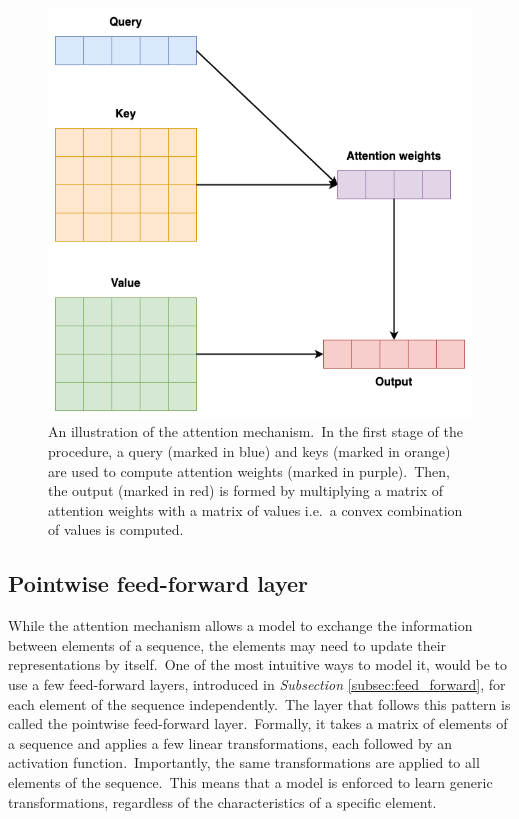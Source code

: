 \documentclass[longabstract, english, mgr]{iithesis}
\theoremstyle{default_theorem_style}\newtheorem{theorem}{Theorem}
\theoremstyle{default_theorem_style}\newtheorem{definition}{Definition}
\begin{document}
\begin{figure}[t]
\centering
\includegraphics[scale=0.4]{attention}
\caption{An illustration of the attention mechanism.\ In the first stage of the procedure, a query (marked in blue) and
keys (marked in orange) are used to compute attention weights (marked in purple).\ Then, the output (marked in red) is
formed by multiplying a matrix of attention weights with a matrix of values i.e.\ a convex combination of
values is computed.}
\label{fig:attention}
\end{figure}

\subsection{Pointwise feed-forward layer}

While the attention mechanism allows a model to exchange the information between elements of a sequence, the elements
may need to update their representations by itself.\ One of the most intuitive ways to model it, would be to use a few
feed-forward layers, introduced in \textit{Subsection} \ref{subsec:feed_forward}, for each element of the sequence
independently.\ The layer that follows this pattern is called the pointwise feed-forward layer.\ Formally, it takes
a matrix of elements of a sequence and applies a few linear transformations, each followed by an activation
function.\ Importantly, the same transformations are applied to all elements of the sequence.\ This means that a
model is enforced to learn generic transformations, regardless of the characteristics of a specific element.
\end{document}
